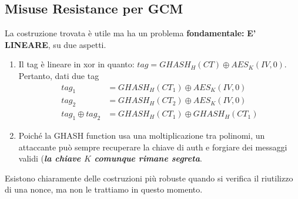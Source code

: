 \subsection{Misuse Resistance per GCM}
La costruzione trovata è utile ma ha un problema \textbf{fondamentale:} \textbf{E' LINEARE}, su due aspetti. 
\begin{enumerate}
    \item Il tag è lineare in xor in quanto: $tag=GHASH_H(CT)\oplus{AES_K(IV,0)}$. Pertanto, dati due tag
    \begin{equation*}
        \begin{aligned}
            tag_1&=GHASH_H(CT_1)\oplus{AES_K(IV,0)}\\
            tag_2&=GHASH_H(CT_2)\oplus{AES_K(IV,0)}\\
            tag_1\oplus{tag_2}&=GHASH_H(CT_1)\oplus{GHASH_H(CT_1)}
        \end{aligned}
    \end{equation*}
    \item Poiché la GHASH function usa una moltiplicazione tra polinomi, un attaccante può sempre recuperare la chiave di auth e forgiare dei messaggi validi (\textit{\textbf{la chiave $K$ comunque rimane segreta}}.
\end{enumerate}
Esistono chiaramente delle costruzioni più robuste quando si verifica il riutilizzo di una nonce, ma non le trattiamo in questo momento.
